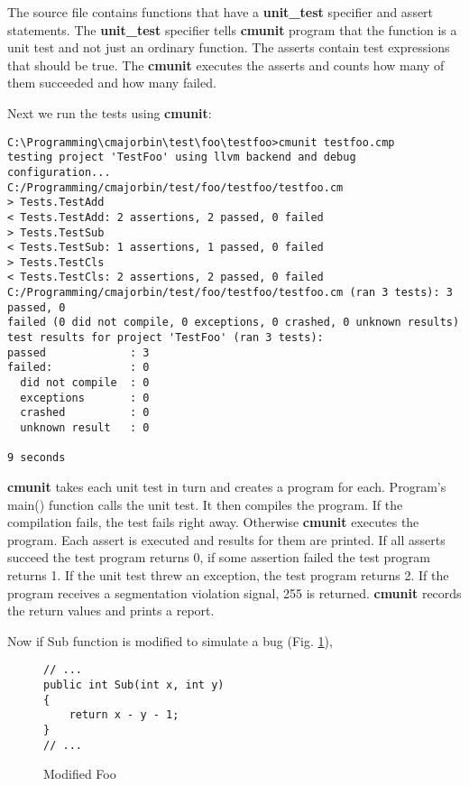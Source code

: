 \documentclass[oneside, a4paper, 11pt]{article}
\begin{document}
The source file contains functions
that have a \textbf{unit\_test} specifier
and assert statements.
The \textbf{unit\_test} specifier
tells \textbf{cmunit} program that
the function is a unit test and not
just an ordinary function.
The asserts contain test expressions
that should be true.
The \textbf{cmunit} executes
the asserts and counts how many of them
succeeded and how many failed.

Next we run the tests using \textbf{cmunit}:

\begin{verbatim}
C:\Programming\cmajorbin\test\foo\testfoo>cmunit testfoo.cmp
testing project 'TestFoo' using llvm backend and debug configuration...
C:/Programming/cmajorbin/test/foo/testfoo/testfoo.cm
> Tests.TestAdd
< Tests.TestAdd: 2 assertions, 2 passed, 0 failed
> Tests.TestSub
< Tests.TestSub: 1 assertions, 1 passed, 0 failed
> Tests.TestCls
< Tests.TestCls: 2 assertions, 2 passed, 0 failed
C:/Programming/cmajorbin/test/foo/testfoo/testfoo.cm (ran 3 tests): 3 passed, 0
failed (0 did not compile, 0 exceptions, 0 crashed, 0 unknown results)
test results for project 'TestFoo' (ran 3 tests):
passed             : 3
failed:            : 0
  did not compile  : 0
  exceptions       : 0
  crashed          : 0
  unknown result   : 0

9 seconds
\end{verbatim}

\textbf{cmunit} takes each unit test in turn and creates a
program for each. Program's main() function calls the unit test.
It then compiles the program. If the compilation fails, the
test fails right away. Otherwise \textbf{cmunit}
executes the program. Each assert is executed and results
for them are printed. If all asserts succeed the test program returns 0,
if some assertion failed the test program returns 1.
If the unit test threw an exception, the test program returns 2.
If the program receives a segmentation violation signal, 255 is returned.
\textbf{cmunit} records the return values and prints a report.

Now if Sub function is modified to simulate a bug (Fig. \ref{fig:modifiedfoo}),

\begin{figure}[htb]\caption{Modified Foo}\label{fig:modifiedfoo}
\begin{lstlisting}[frame=trBL]
// ...
public int Sub(int x, int y)
{
    return x - y - 1;
}
// ...
\end{lstlisting}
\end{figure}
\end{document}
